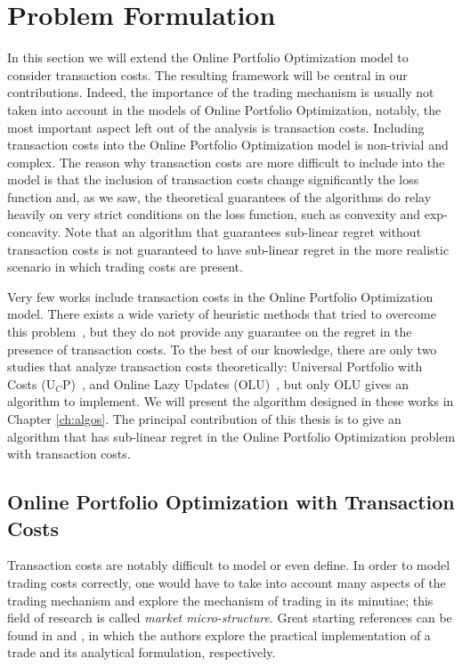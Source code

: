 \chapter{Problem Formulation}\label{ch:transaction_costs}

In this section we will extend the Online Portfolio Optimization model to consider transaction costs. The resulting framework will be central in our contributions.  
Indeed, the importance of the trading mechanism is usually not taken into account in the models of Online Portfolio Optimization, notably, the most important aspect left out of the analysis is transaction costs. Including transaction costs into the Online Portfolio Optimization model is non-trivial and complex. The reason why transaction costs are more difficult to include into the model is that the inclusion of transaction costs change significantly the loss function and, as we saw, the theoretical guarantees of the algorithms do relay heavily on very strict conditions on the loss function, such as convexity and exp-concavity.
Note that an algorithm that guarantees sub-linear regret without transaction costs is not guaranteed to have sub-linear regret in the more realistic scenario in which trading costs are present. 

Very few works include transaction costs in the Online Portfolio Optimization model. 
There exists a wide variety of heuristic methods that tried to overcome this problem~\cite{li2018transaction,yang2018reversion}, but they do not provide any guarantee on the regret in the presence of transaction costs. 
To the best of our knowledge, there are only two studies that analyze transaction costs theoretically: Universal Portfolio with Costs (U$_C$P)~\cite{blum1999universal}, and Online Lazy Updates (OLU)~\cite{das2013online}, but only OLU gives an algorithm to implement. We will present the algorithm designed in these works in Chapter \ref{ch:algos}. The principal contribution of this thesis is to give an algorithm that has sub-linear regret in the Online Portfolio Optimization problem with transaction costs.

\section{Online Portfolio Optimization with Transaction Costs}

Transaction costs are notably difficult to model or even define. In order to model trading costs correctly, one would have to take into account many aspects of the trading mechanism and explore the mechanism of trading in its minutiae; this field of research is called \emph{market micro-structure}. Great starting references can be found in \cite{harris2003trading} and \cite{o1997market}, in which the authors explore the practical implementation of a trade and its analytical formulation, respectively. 

